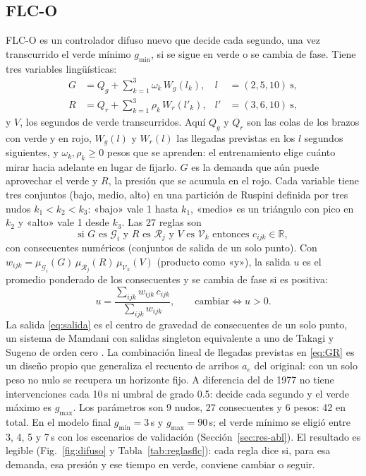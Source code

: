 \documentclass[journal]{IEEEtran}
\newcommand{\FLC}{FLC-O}
\begin{document}
\subsection{FLC-O}
\label{sec:flc}
\FLC{} es un controlador difuso nuevo que decide cada segundo, una vez transcurrido el verde mínimo $g_{\min}$, si se sigue en verde o se cambia de fase. Tiene tres variables lingüísticas:
\begin{align}
G&=Q_g+\textstyle\sum_{k=1}^{3}\omega_k\,W_g(l_k), & l&=(2,5,10)\ \text{s},\nonumber\\
R&=Q_r+\textstyle\sum_{k=1}^{3}\rho_k\,W_r(l'_k), & l'&=(3,6,10)\ \text{s},\label{eq:GR}
\end{align}
y $V$, los segundos de verde transcurridos. Aquí $Q_g$ y $Q_r$ son las colas de los brazos con verde y en rojo, $W_g(l)$ y $W_r(l)$ las llegadas previstas en los $l$ segundos siguientes, y $\omega_k,\rho_k\ge0$ pesos que se aprenden: el entrenamiento elige cuánto mirar hacia adelante en lugar de fijarlo. $G$ es la demanda que aún puede aprovechar el verde y $R$, la presión que se acumula en el rojo. Cada variable tiene tres conjuntos (bajo, medio, alto) en una partición de Ruspini definida por tres nudos $k_1<k_2<k_3$: «bajo» vale 1 hasta $k_1$, «medio» es un triángulo con pico en $k_2$ y «alto» vale 1 desde $k_3$. Las 27 reglas son
\begin{equation}
\text{si } G \text{ es } \mathcal{G}_i \text{ y } R \text{ es } \mathcal{R}_j \text{ y } V \text{ es } \mathcal{V}_k \text{ entonces } c_{ijk}\in\mathbb{R},
\label{eq:reglaflc}
\end{equation}
con consecuentes numéricos (conjuntos de salida de un solo punto). Con $w_{ijk}=\mu_{\mathcal{G}_i}(G)\,\mu_{\mathcal{R}_j}(R)\,\mu_{\mathcal{V}_k}(V)$ (producto como «y»), la salida $u$ es el promedio ponderado de los consecuentes y se cambia de fase si es positiva:
\begin{equation}
u=\frac{\sum_{ijk}w_{ijk}\,c_{ijk}}{\sum_{ijk}w_{ijk}},\qquad \text{cambiar}\iff u>0 .
\label{eq:salida}
\end{equation}
La salida \eqref{eq:salida} es el centro de gravedad de consecuentes de un solo punto, un sistema de Mamdani con salidas singleton equivalente a uno de Takagi y Sugeno de orden cero \cite{TakagiSugeno1985}. La combinación lineal de llegadas previstas en \eqref{eq:GR} es un diseño propio que generaliza el recuento de arribos $a_e$ del original: con un solo peso no nulo se recupera un horizonte fijo. A diferencia del de 1977 no tiene intervenciones cada 10\,s ni umbral de grado 0.5: decide cada segundo y el verde máximo es $g_{\max}$. Los parámetros son 9 nudos, 27 consecuentes y 6 pesos: 42 en total. En el modelo final $g_{\min}=3$\,s y $g_{\max}=90$\,s; el verde mínimo se eligió entre 3, 4, 5 y 7\,s con los escenarios de validación (Sección~\ref{sec:res-abl}). El resultado es legible (Fig.~\ref{fig:difuso} y Tabla~\ref{tab:reglasflc}): cada regla dice si, para esa demanda, esa presión y ese tiempo en verde, conviene cambiar o seguir.
\end{document}
